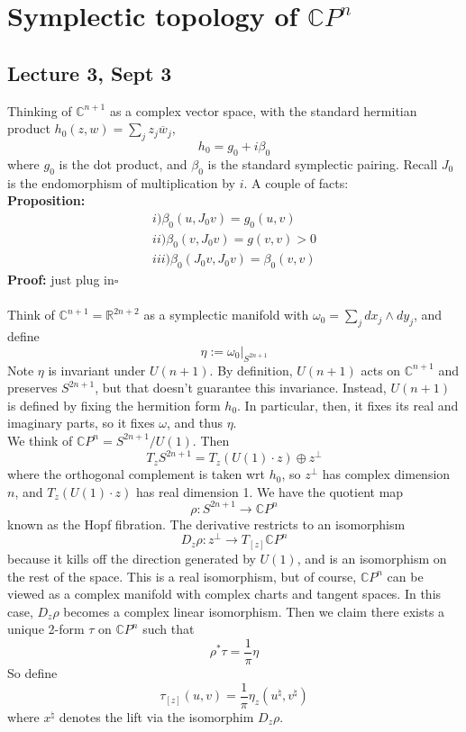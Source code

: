 \documentclass[12pt]{report}
\theoremstyle{definition}
\theoremstyle{remark}
\numberwithin{equation}{section}
\theoremstyle{definition}
\newcommand{\bb}[1]{\mathbb{#1}}
\newcommand{\mqed}{\hfill\newline\null \hfill$\square$\\ }
\begin{document}
\chapter{Symplectic topology of $\bb CP^n$}
\section*{Lecture 3, Sept 3}
\label{sec:3} 
Thinking of $\bb C^{n+1}$ as a complex vector space, with the standard hermitian product $h_0(z,w) = \sum_j z_j \overline{w}_j$, 
$$
	h_0 = g_0 + i\beta_0
$$ 
where $g_0$ is the dot product, and $\beta_0$ is the standard symplectic pairing. Recall $J_0$ is the endomorphism of multiplication by $i$. A couple of facts:\\
\textbf{Proposition: }
\begin{gather*}
	i) \beta_0(u,J_0 v) = g_0(u,v)\\
	ii) \beta_0(v,J_0v) = g(v,v) > 0\\
	iii) \beta_0(J_0v,J_0v) = \beta_0(v,v)
\end{gather*}
\textbf{Proof: }just plug in\mqed\\
Think of $\bb C^{n+1} = \bb R^{2n+2}$ as a symplectic manifold with $\omega_0 = \sum_j dx_j \wedge dy_j$, and define 
$$
	\eta := \omega_0|_{S^{2n+1}}
$$
Note $\eta$ is invariant under $U(n+1)$. By definition, $U(n+1)$ acts on $\bb C^{n+1}$ and preserves $S^{2n+1}$, but that doesn't guarantee this invariance. Instead, $U(n+1)$ is defined by fixing the hermition form $h_0$. In particular, then, it fixes its real and imaginary parts, so it fixes $\omega$, and thus $\eta$. \\
We think of $\bb CP^n = S^{2n+1} \big/ U(1)$. Then 
$$
	T_z S^{2n+1} = T_z(U(1)\cdot z) 	\oplus z^\perp
$$
where the orthogonal complement is taken wrt $h_0$, so $z^\perp$ has complex dimension $n$, and $T_z(U(1)\cdot z)$ has real dimension 1. We have the quotient map
$$
	\rho: S^{2n+1} \to \bb CP^n
$$
known as the Hopf fibration. The derivative restricts to an isomorphism
$$
	D_z\rho: z^\perp \to T_{[z]} \bb CP^n
$$
because it kills off the direction generated by $U(1)$, and is an isomorphism on the rest of the space. This is a real isomorphism, but of course, $\bb CP^n$ can be viewed as a complex manifold with complex charts and tangent spaces. In this case, $D_z\rho$ becomes a complex linear isomorphism. Then we claim there exists a unique 2-form $\tau$ on $\bb CP^n$ such that 
$$
	\rho^*\tau = \frac{1}{\pi}\eta
$$
So define 
$$
\tau_{[z]}(u,v) = \frac{1}{\pi}\eta_z(u^\natural, v^\natural)
$$
where $x^\natural$ denotes the lift via  the isomorphim $D_z\rho$. \\
\end{document}
